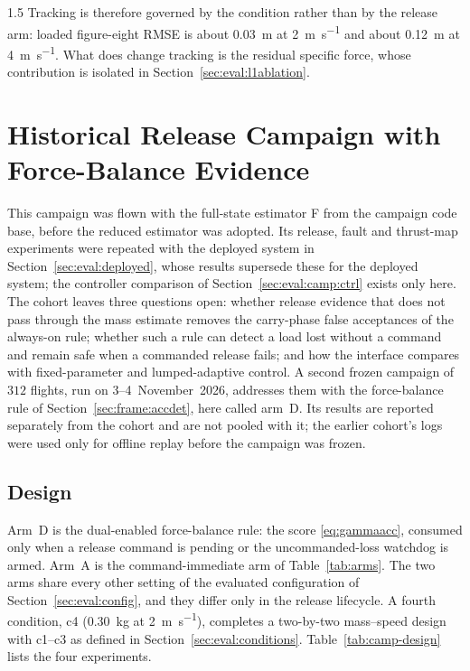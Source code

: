 \begin{spacing}{1.5}
Tracking is therefore governed by the condition rather than by the release arm:
loaded figure-eight RMSE is about \SI{0.03}{\meter} at \SI{2}{\meter\per\second}
and about \SI{0.12}{\meter} at \SI{4}{\meter\per\second}. What does change
tracking is the residual specific force, whose contribution is isolated in
Section~\ref{sec:eval:l1ablation}.

\section{Historical Release Campaign with Force-Balance Evidence}\label{sec:eval:campaign}

This campaign was flown with the full-state estimator F from the campaign code
base, before the reduced estimator was adopted. Its release, fault and
thrust-map experiments were repeated with the deployed system in
Section~\ref{sec:eval:deployed}, whose results supersede these for the deployed
system; the controller comparison of Section~\ref{sec:eval:camp:ctrl} exists
only here. The cohort leaves three questions open: whether release evidence that does not
pass through the mass estimate removes the carry-phase false acceptances of the
always-on rule; whether such a rule can detect a load lost without a command and
remain safe when a commanded release fails; and how the interface compares with
fixed-parameter and lumped-adaptive control. A second frozen campaign of $312$
flights, run on 3--4~November~2026, addresses them with the force-balance rule
of Section~\ref{sec:frame:accdet}, here called arm~D. Its results are reported
separately from the cohort and are not pooled with it; the earlier cohort's logs
were used only for offline replay before the campaign was frozen.

\subsection{Design}\label{sec:eval:camp:design}

Arm~D is the dual-enabled force-balance rule: the score \eqref{eq:gammaacc},
consumed only when a release command is pending or the uncommanded-loss
watchdog is armed. Arm~A is the command-immediate arm of Table~\ref{tab:arms}.
The two arms share every other setting of the evaluated configuration of
Section~\ref{sec:eval:config}, and they differ only in the release lifecycle.
A fourth condition, c4 (\SI{0.30}{\kg} at \SI{2}{\meter\per\second}), completes
a two-by-two mass--speed design with c1--c3 as defined in
Section~\ref{sec:eval:conditions}. Table~\ref{tab:camp-design} lists the four
experiments.


\end{spacing}
